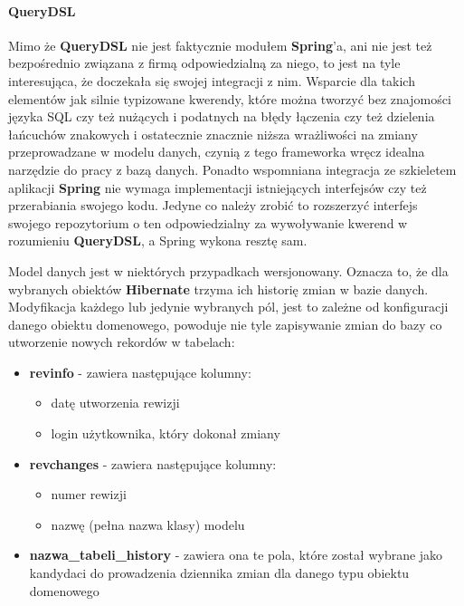 			\paragraph{QueryDSL}	
				Mimo że \textbf{QueryDSL} nie jest faktycznie modułem \textbf{Spring}'a, ani nie jest też bezpośrednio związana z firmą odpowiedzialną
				za niego, to jest na tyle interesująca, że doczekała się swojej integracji z nim. Wsparcie dla takich elementów jak silnie typizowane
				kwerendy, które można tworzyć bez znajomości języka SQL czy też nużących i podatnych na błędy łączenia czy też dzielenia łańcuchów
				znakowych i ostatecznie znacznie niższa wrażliwości na zmiany przeprowadzane w modelu danych, czynią z tego frameworka wręcz idealna narzędzie
				do pracy z bazą danych. Ponadto wspomniana integracja ze szkieletem aplikacji \textbf{Spring} nie wymaga implementacji istniejących
				interfejsów czy też przerabiania swojego kodu. Jedyne co należy zrobić to rozszerzyć interfejs swojego repozytorium o ten odpowiedzialny
				za wywoływanie kwerend w rozumieniu \textbf{QueryDSL}, a Spring wykona resztę sam.
				
			Model danych jest w niektórych przypadkach wersjonowany. Oznacza to, że dla wybranych obiektów \textbf{Hibernate} trzyma ich historię zmian
			w bazie danych. Modyfikacja każdego lub jedynie wybranych pól, jest to zależne od konfiguracji danego obiektu domenowego, powoduje nie tyle
			zapisywanie zmian do bazy co utworzenie nowych rekordów w tabelach:
			\begin{itemize}
				\item \textbf{revinfo} - zawiera następujące kolumny:
				\begin{itemize}
					\item datę utworzenia rewizji
					\item login użytkownika, który dokonał zmiany
				\end{itemize} 
				\item \textbf{revchanges} - zawiera następujące kolumny:
				\begin{itemize}
					\item numer rewizji
					\item nazwę (pełna nazwa klasy) modelu
				\end{itemize}
				\item \textbf{nazwa\_tabeli\_history} - zawiera ona te pola, które został wybrane jako kandydaci do prowadzenia 
				dziennika zmian dla danego typu obiektu domenowego
			\end{itemize}
			
